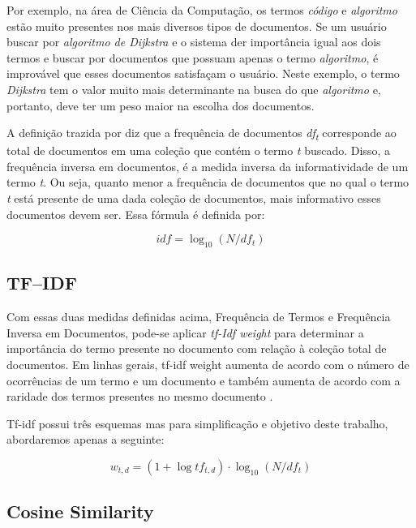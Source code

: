 Por exemplo, na área de Ciência da Computação, os termos \textit{código} e \textit{algoritmo} estão muito presentes nos mais diversos tipos de documentos. Se um usuário buscar por \textit{algoritmo de Dijkstra} e o sistema der importância igual aos dois termos e buscar por documentos que possuam apenas o termo \textit{algoritmo}, é improvável que esses documentos satisfaçam o usuário. Neste exemplo, o termo \textit{Dijkstra} tem o valor muito mais determinante na busca do que \textit{algoritmo} e, portanto, deve ter um peso maior na escolha dos documentos.

A definição trazida por \cite{Manning2008} diz que a frequência de documentos \textit{df\textsubscript{t}} corresponde ao total de documentos em uma coleção que contém o termo \textit{t} buscado. Disso, a frequência inversa em documentos, é a medida inversa da informatividade de um termo \textit{t}. Ou seja, quanto menor a frequência de documentos que no qual o termo \textit{t} está presente de uma dada coleção de documentos, mais informativo esses documentos devem ser. Essa fórmula é definida por:

\begin{equation}
idf = \log_{10}(N/df_{t})
\label{eq:idf}
\end{equation}

\subsection{TF–IDF}

Com essas duas medidas definidas acima, Frequência de Termos e Frequência Inversa em Documentos, pode-se aplicar \textit{tf-Idf weight} para determinar a importância do termo presente no documento com relação à coleção total de documentos. Em linhas gerais, tf-idf weight aumenta de acordo com o número de ocorrências de um termo e um documento e também aumenta de acordo com a raridade dos termos presentes no mesmo documento \cite{Manning2008}. 

Tf-idf possui três esquemas mas para simplificação e objetivo deste trabalho, abordaremos apenas a seguinte:
 
\begin{equation}
w_{t,d} = (1 + \log tf_{t,d}) \cdot \log_{10}(N/df_{t})
\label{eq:tf-idf}
\end{equation}

\subsection{Cosine Similarity}

